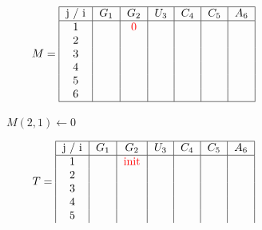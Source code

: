 \begin{figure}[H]
    \centering
    \begin{subfigure}[t]{0.25\textwidth}
        \scriptsize \[
                        M =  \begin{tabular}{|c|c|c|c|c|c|c|}
                                 \hline
                                 j / i & $G_1$ & $G_2$              & $U_3$ & $C_4$ & $C_5$ & $A_6$ \\ \hline
                                 1     &       & \textcolor{red}{0} &       &       &       &       \\
                                 2     &       &                    &       &       &       &       \\
                                 3     &       &                    &       &       &       &       \\
                                 4     &       &                    &       &       &       &       \\
                                 5     &       &                    &       &       &       &       \\
                                 6     &       &                    &       &       &       &       \\ \hline
                        \end{tabular}
        \]
        \caption{$M(2,1) \gets 0$}
    \end{subfigure}
    \hfill
    \begin{subfigure}[t]{0.65\textwidth}
        \scriptsize \[
                        T =     \begin{tabular}{|c|c|c|c|c|c|c|}
                                    \hline
                                    j / i & $G_1$ & $G_2$                 & $U_3$ & $C_4$ & $C_5$ & $A_6$ \\ \hline
                                    1     &       & \textcolor{red}{init} &       &       &       &       \\
                                    2     &       &                       &       &       &       &       \\
                                    3     &       &                       &       &       &       &       \\
                                    4     &       &                       &       &       &       &       \\
                                    5     &       &                       &       &       &       &       \\

\end{tabular}\]
\end{subfigure}
\end{figure}
